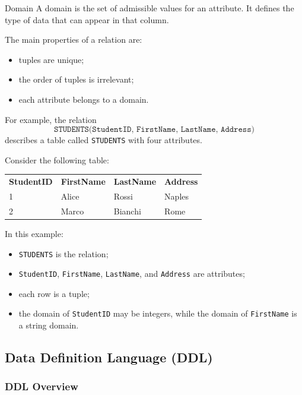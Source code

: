  \begin{defbox}{Domain}
  A domain is the set of admissible values for an attribute. It defines the type of data that can appear in that column.
 \end{defbox}

 \pagebreak

 The main properties of a relation are:
 \begin{itemize}
  \item tuples are unique;
  \item the order of tuples is irrelevant;
  \item each attribute belongs to a domain.
 \end{itemize}

 For example, the relation
 \[
  \texttt{STUDENTS(StudentID, FirstName, LastName, Address)}
 \]
 describes a table called \texttt{STUDENTS} with four attributes.

 \vs
 \begin{example}
  Consider the following table:
  \begin{center}
   \begin{tabular}{llll}
    \textbf{StudentID} & \textbf{FirstName} & \textbf{LastName} & \textbf{Address} \\
    1 & Alice & Rossi & Naples \\
    2 & Marco & Bianchi & Rome
   \end{tabular}
  \end{center}

  In this example:
  \begin{itemize}
   \item \texttt{STUDENTS} is the relation;
   \item \texttt{StudentID}, \texttt{FirstName}, \texttt{LastName}, and \texttt{Address} are attributes;
   \item each row is a tuple;
   \item the domain of \texttt{StudentID} may be integers, while the domain of \texttt{FirstName} is a string domain.
  \end{itemize}
 \end{example}

\subsection{Data Definition Language (DDL)}

 \subsubsection{DDL Overview}

